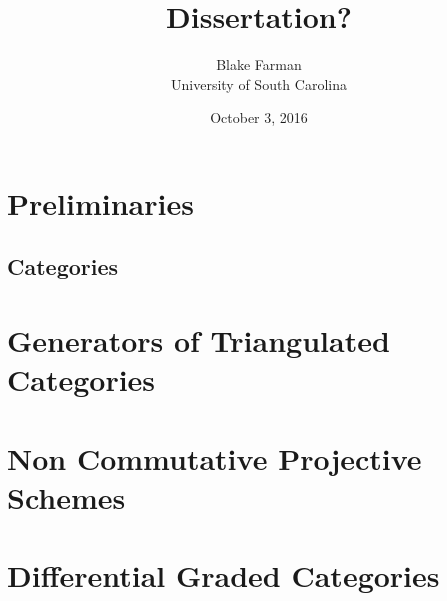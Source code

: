 \documentclass[10pt]{book}
\author{Blake Farman\\University of South Carolina}
\title{Dissertation?}
\date{October 3, 2016}
\begin{document}

\tableofcontents

\newtheorem{thm}{Theorem}
\newtheorem{ex}{}
\newtheorem{lem}{Lemma}
\newtheorem{cor}{Corollary}
\newtheorem{prop}{Proposition}

\theoremstyle{definition}
\newtheorem{defn}{Definition}
\newtheorem{rmk}{Remark}
\newtheorem{eg}{Example}

\chapter{Preliminaries}
\section{Categories}

\chapter{Generators of Triangulated Categories}

\chapter{Non Commutative Projective Schemes}

\chapter{Differential Graded Categories}

\end{document}
